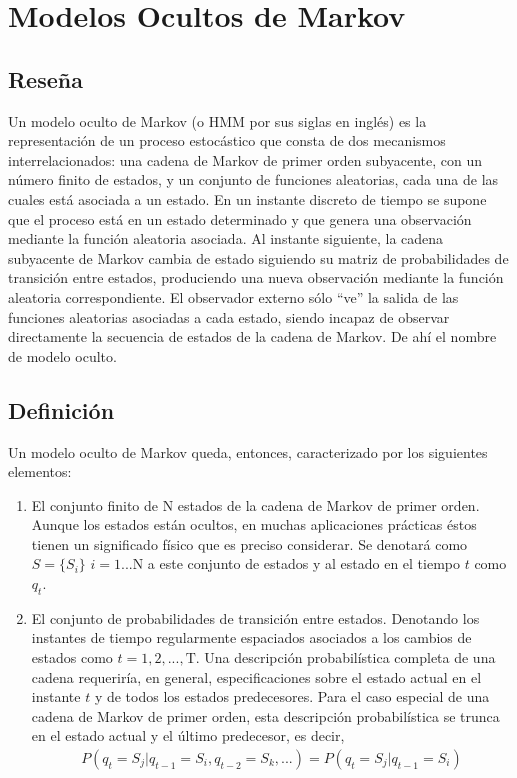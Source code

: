 \section{Modelos Ocultos de Markov}

\subsection{Reseña}
Un modelo oculto de Markov (o HMM por sus siglas en inglés) es la representación de un proceso estocástico que consta de dos mecanismos interrelacionados: una cadena de Markov de primer orden subyacente, con un número finito de estados, y un conjunto de funciones aleatorias, cada una de las cuales está asociada a un estado. En un instante discreto de tiempo se supone que el proceso está en un estado determinado y que genera una observación mediante la función aleatoria asociada. Al instante siguiente, la cadena subyacente de Markov cambia de estado siguiendo su matriz de probabilidades de transición entre estados, produciendo una nueva observación mediante la función aleatoria correspondiente. El observador externo sólo ``ve'' la salida de las funciones aleatorias asociadas a cada estado, siendo incapaz de observar directamente la secuencia de estados de la cadena de Markov. De ahí el nombre de modelo oculto.

\subsection{Definición}
Un modelo oculto de Markov queda, entonces, caracterizado por los siguientes elementos:
\begin{enumerate}
\item El conjunto finito de N estados de la cadena de Markov de primer orden.
Aunque los estados están ocultos, en muchas aplicaciones prácticas éstos tienen un significado físico que es preciso considerar. Se denotará como $S=\{S_i\}$ $i=1...\mathrm{N}$ a este conjunto de estados y al estado en el tiempo $t$ como $q_t$.
\item El conjunto de probabilidades de transición entre estados. Denotando los instantes de tiempo regularmente espaciados asociados a los cambios de estados como $t=1,2,...,\mathrm{T}$. Una descripción probabilística completa de una cadena requeriría, en general, especificaciones sobre el estado actual en el instante $t$ y de todos los estados predecesores. Para el caso especial de una cadena de Markov de primer orden, esta descripción probabilística se trunca en el estado actual y el último predecesor, es decir,
\begin{align*}
P(q_t=S_j | q_{t-1}=S_i, q_{t-2}=S_k, ...)=P(q_t=S_j | q_{t-1}=S_i)    
\end{align*}
\end{enumerate}

